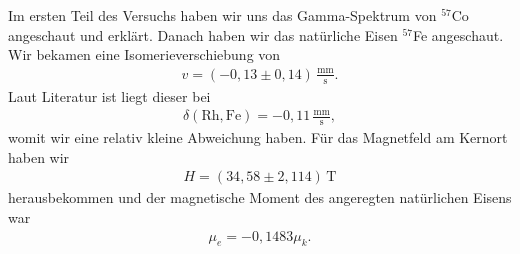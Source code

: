 \documentclass[10pt,twoside]{article}
\renewcommand{\1}{^{-1}}
\renewcommand{\2}{^{-2}}
\newcommand{\3}{^{-3}}
\newcommand{\4}{^{-4}}
\newcommand{\5}{^{-5}}
\newcommand{\6}{^{-6}}
\newcommand{\7}{^{-7}}
\newcommand{\8}{^{-8}}
\newcommand{\9}{^{-9}}
\begin{document}
Im ersten Teil des Versuchs haben wir uns das Gamma-Spektrum von $^{57}$Co angeschaut und erklärt. Danach haben wir das natürliche Eisen $^{57}$Fe angeschaut. Wir bekamen eine Isomerieverschiebung von
\begin{align*}
v=(-0,13\pm0,14)\,\frac{\text{mm}}{\text{s}}.
\end{align*}
Laut Literatur ist liegt dieser bei
\begin{align*}
\delta(\text{Rh},\text{Fe})=-0,11\,\frac{\text{mm}}{\text{s}},
\end{align*}
womit wir eine relativ kleine Abweichung haben. Für das Magnetfeld am Kernort haben wir
\begin{align*}
H=(34,58\pm 2,114)\,\text{T}
\end{align*}
herausbekommen und der magnetische Moment des angeregten natürlichen Eisens war
\begin{align*}
\mu_e = -0,1483\mu_k.
\end{align*}
\end{document}

